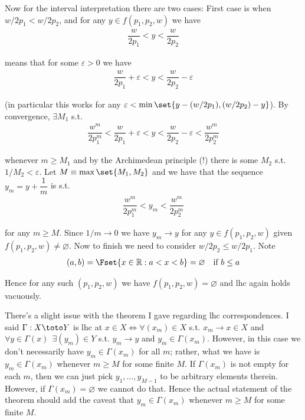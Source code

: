 \documentclass{article}
\begin{document}
\begin{enumerate}[1.]
\begin{enumerate}
        Now for the interval interpretation there are two cases: First case is when $w/2p_1 < w/2p_2$, and for any $y \in f(p_1, p_2, w)$ we have
        \begin{align*}
          \dfrac{w}{2 p_1} < y < \dfrac{w}{2 p_2}
        \end{align*}

        means that  for some $\varepsilon > 0$ we have
        \begin{align*}
          \dfrac{w}{2 p_1} + \varepsilon < y < \dfrac{w}{2 p_2} - \varepsilon
        \end{align*}

        (in particular this works for any $\varepsilon < \min\set{y - (w / 2p_1), (w/2p_2) - y}$). By convergence, $\exists M_1$ s.t.
        \begin{align*}
          \dfrac{w^m}{2 p_1^m} < \dfrac{w}{2 p_1} + \varepsilon
          <
          y
          <
          \dfrac{w}{2 p_2} - \varepsilon
          <
          \dfrac{w^m}{2 p_2^m}
        \end{align*}

        whenever $m \ge M_1$ and by the Archimedean principle (!) there is some $M_2$ s.t. $1 / M_2 < \varepsilon$. Let $M \equiv \max\set{M_1, M_2}$ and we have that the sequence $y_m = y + \dfrac{1}{m}$ is s.t.
        \begin{align*}
          \dfrac{w^m}{2 p_1^m}
          <
          y_m
          <
          \dfrac{w^m}{2 p_2^m}
        \end{align*}

        for any $m \ge M$. Since $1/m \to 0$ we have $y_m \to y$ for any $y \in f(p_1, p_2, w)$ given $f(p_1, p_2, w) \ne \varnothing$. Now to finish we need to consider $w/2 p_2 \le w/2p_1$. Note
        \begin{align*}
          (a, b) = \Fset{x \in \mathbb{R}: a < x < b} = \varnothing \quad\text{if $b \le a$}
        \end{align*}

        Hence for any such $(p_1, p_2, w)$ we have $f(p_1, p_2, w) = \varnothing$ and lhc again holds vacuously.
    \end{enumerate}

    \begin{remark}
      There's a slight issue with the theorem I gave regarding lhc correspondences. I said $\Gamma: X \toto Y$ is lhc at $x \in X \iff \forall (x_m) \in X$ s.t. $x_m \to x \in X$ and $\forall y \in \Gamma(x) ~~ \exists (y_m) \in Y$ s.t. $y_m \to y$ and $y_m \in \Gamma(x_m)$. However, in this case we don't necessarily have $y_m \in \Gamma(x_m)$ for all $m$; rather, what we have is $y_m \in \Gamma(x_m)$ whenever $m \ge M$ for some finite $M$. If $\Gamma(x_m)$ is not empty for each $m$, then we can just pick $y_1, \ldots, y_{M - 1}$ to be arbitrary elements therein. However, if $\Gamma(x_m) = \varnothing$ we cannot  do that. Hence the actual statement of the theorem should add the caveat that $y_m \in \Gamma(x_m)$ whenever $m \ge M$ for some finite $M$.
    \end{remark}
\end{enumerate}

\end{document}
